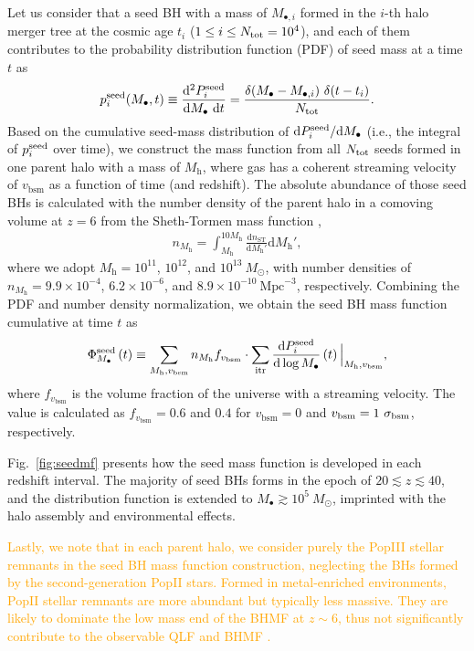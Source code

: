 \documentclass[twocolumn, twocolappendix]{aastex63}
\newcommand{\Msun}{M_\odot}
\newcommand{\Mh}{M_\mathrm{h}}
\newcommand{\Mbh}{M_\bullet}
\newcommand{\vbsm}{v_\mathrm{bsm}}
\newcommand{\D}{\mathrm{d}}
\newcommand{\orange}[1]{\textcolor{orange}{ #1}}
\begin{document}
\begin{CJK*}{UTF8}{gbsn}
Let us consider that a seed BH with a mass of $M_{\bullet,i}$ formed in the $i$-th halo merger tree at the cosmic age 
$t_i$ ($1\leq i \leq N_{\rm tot}=10^4$),
and each of them contributes to the probability distribution function (PDF) of seed mass at a time $t$ as
% 
\begin{equation}
  p^{\rm seed}_i (\Mbh,t)\equiv \frac{\D^2 P^{\rm seed}_i}{\D \Mbh ~\D t}= \frac{ \delta(\Mbh-M_{\bullet,i})~ \delta(t-t_i)}{N_{\rm tot}}.
\end{equation}
%
Based on the cumulative seed-mass distribution of $\D P^{\rm seed}_i/ \D \Mbh$
(i.e., the integral of $p^{\rm seed}_i$ over time),
we construct the mass function from all $N_{\rm tot}$ seeds formed in one parent halo
with a mass of $\Mh$, where gas has a coherent streaming velocity of $\vbsm$ as a function of time (and redshift).
The absolute abundance of those seed BHs is calculated with the number density of the parent halo in a comoving volume at $z=6$ 
from the Sheth-Tormen mass function \citep{2001MNRAS.323....1S},
%
\begin{align}
  n_{\Mh}= \int_{\Mh}^{10\Mh}  \frac{\D n_{\mathrm{ST}}} {\D \Mh'} \D \Mh', 
\end{align}
%
where we adopt $\Mh = 10^{11}$, $10^{12}$, and $10^{13}~\Msun$, with number densities of
$n_{\Mh} = 9.9\times 10^{-4}$, $6.2\times 10^{-6}$, and $8.9\times 10^{-10}~ \text{Mpc}^{-3}$, respectively.
Combining the PDF and number density normalization, we obtain the seed BH mass function cumulative at time $t$ as
%
\begin{align}
\Phi_{\Mbh}^{\rm seed}\left(t\right) \equiv \sum_{\Mh, \vbsm} n_{\Mh} f_{\vbsm} 
\cdot \sum_{\rm itr} \frac{\D P^{\rm seed}_i}{\D \log \Mbh}\left(t\right) \Big| _{\Mh, \vbsm},
\end{align}
%
where $f_{\vbsm}$ is the volume fraction of the universe with a streaming velocity.
The value is calculated as $f_{\vbsm} = 0.6$ and $0.4$ for $\vbsm = 0$ and $\vbsm=1~\sigma_{\rm bsm}$, respectively.

Fig.~\ref{fig:seedmf} presents how the seed mass function is developed in each redshift interval.
The majority of seed BHs forms in the epoch of $20\lesssim z \lesssim 40$, and the distribution function is 
extended to $M_\bullet \gtrsim 10^5~\Msun$, imprinted with the halo assembly and environmental effects.

\orange{
Lastly, we note that in each parent halo, we consider purely the PopIII stellar remnants in the seed BH mass function construction,
neglecting the BHs formed by the second-generation PopII stars.
Formed in metal-enriched environments, PopII stellar remnants are more abundant but typically less massive.
They are likely to dominate the low mass end of the BHMF at $z\sim 6$,
thus not significantly contribute to the observable QLF and BHMF \citep{2022MNRAS.511..616T}.
}



\end{CJK*}
\end{document}
